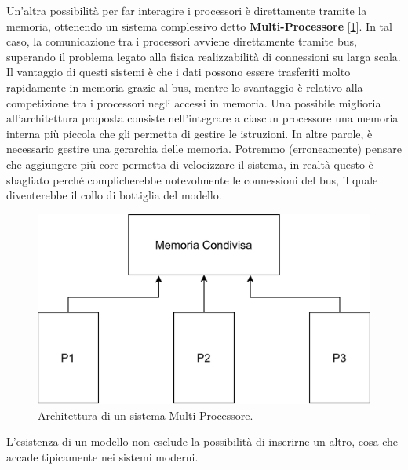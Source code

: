 Un'altra possibilità per far interagire i processori è direttamente tramite la memoria, ottenendo un sistema complessivo detto \textbf{Multi-Processore} [\ref{fig:multi-processore}]. In tal caso, la comunicazione tra i processori avviene direttamente tramite bus, superando il problema legato alla fisica realizzabilità di connessioni su larga scala. Il vantaggio di questi sistemi è che i dati possono essere trasferiti molto rapidamente in memoria grazie al bus, mentre lo svantaggio è relativo alla competizione tra i processori negli accessi in memoria. Una possibile miglioria all'architettura proposta consiste nell'integrare a ciascun processore una memoria interna più piccola che gli permetta di gestire le istruzioni. In altre parole, è necessario gestire una gerarchia delle memoria. 
Potremmo (erroneamente) pensare che aggiungere più core permetta di velocizzare il sistema, in realtà questo è sbagliato perché complicherebbe notevolmente le connessioni del bus, il quale diventerebbe il collo di bottiglia del modello.
\begin{figure}[!h]
    \centering
    \includegraphics[width=0.5\linewidth]{img/multi-computer.png}
    \caption{Architettura di un sistema Multi-Processore.}
    \label{fig:multi-processore}
\end{figure}
L'esistenza di un modello non esclude la possibilità di inserirne un altro, cosa che accade tipicamente nei sistemi moderni.


